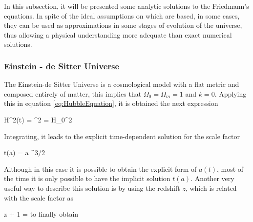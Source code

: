In this subsection, it will be presented some analytic solutions to the 
Friedmann's equations. In spite of the ideal assumptions on which are
based, in some cases, they can be used as approximations in some stages
of evolution of the universe, thus allowing a physical understanding more 
adequate than exact numerical solutions.



			\subsubsection*{Einstein - de Sitter Universe}


The Einstein-de Sitter Universe is a cosmological model with a flat metric
and composed entirely of matter, this implies that $\Omega_0 = \Omega_m = 1$ 
and $k=0$. Applying this in equation \ref{eq:HubbleEquation}, it is obtained
the next expression



{ H^2(t) = ^2 = H_0^2  }


Integrating, it leads to the explicit time-dependent solution for the 
scale factor



{ t(a) =  a ^{3/2} }


Although in this case it is possible to obtain the explicit form of $a(t)$,
most of the time it is only possible to have the implicit solution $t(a)$.
Another very useful way to describe this solution is by using the redshift
$z$, which is related with the scale factor as \cite{longair2008}


{ z + 1 =  }
to finally obtain



